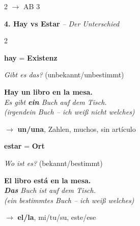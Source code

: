 \documentclass[11pt, a4paper]{article}
\newcommand{\seriftext}[1]{{\fontfamily{ppl}\selectfont #1}}
\newcommand{\es}[1]{\seriftext{\textbf{#1}}}
\newcommand{\de}[1]{\textit{\textcolor{akzent}{#1}}}
\newcommand{\abmark}[1]{{\footnotesize\textcolor{akzent}{$\rightarrow$ AB #1}}}
\newcommand{\abschnitt}[2]{\noindent\textbf{\large #1. #2}}
\begin{document}
\begin{multicols}{2}
\abmark{3}

\end{multicols}


\vspace{6pt}

\abschnitt{4}{Hay vs Estar} \de{-- Der Unterschied}

\vspace{4pt}

\begin{vergleichbox}
\begin{multicols}{2}

{\large\bfseries hay} = \textbf{Existenz}

\vspace{4pt}

\textit{Gibt es das?} (unbekannt/unbestimmt)

\vspace{4pt}

{\small
\es{Hay \textbf{un} libro en la mesa.}\\
\de{Es gibt \textbf{ein} Buch auf dem Tisch.}\\
\de{(irgendein Buch -- ich weiß nicht welches)}}

\vspace{4pt}

$\rightarrow$ \textbf{un/una}, Zahlen, muchos, sin artículo

\columnbreak

{\large\bfseries estar} = \textbf{Ort}

\vspace{4pt}

\textit{Wo ist es?} (bekannt/bestimmt)

\vspace{4pt}

{\small
\es{\textbf{El} libro está en la mesa.}\\
\de{\textbf{Das} Buch ist auf dem Tisch.}\\
\de{(ein bestimmtes Buch -- ich weiß welches)}}

\vspace{4pt}

$\rightarrow$ \textbf{el/la}, mi/tu/su, este/ese

\end{multicols}
\end{vergleichbox}
\end{document}
